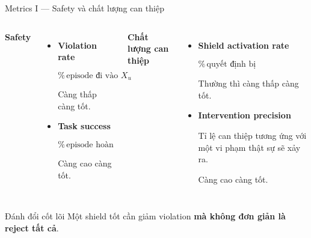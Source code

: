 \documentclass[aspectratio=169]{beamer}
\begin{document}
\begin{frame}[t,shrink=8]{Metrics I --- Safety và chất lượng can thiệp}

\begin{columns}[T]


\textbf{Safety}

\begin{itemize}
    \item \textbf{Violation rate}

    \[
    \%\,\text{episode đi vào }X_u
    \]

    Càng thấp càng tốt.

    \item \textbf{Task success}

    \[
    \%\,\text{episode hoàn thành nhiệm vụ}
    \]

    Càng cao càng tốt.
\end{itemize}


\textbf{Chất lượng can thiệp}

\begin{itemize}
    \item \textbf{Shield activation rate}

    \[
    \%\,\text{quyết định bị reject/repair/fallback}
    \]

    Thường thì càng thấp càng tốt.

    \item \textbf{Intervention precision}

    Tỉ lệ can thiệp tương ứng với một vi phạm thật sự
    sẽ xảy ra.

    Càng cao càng tốt.
\end{itemize}

\end{columns}

\vspace{7pt}

\begin{alertblock}{Đánh đổi cốt lõi}
Một shield tốt cần giảm violation \textbf{mà không đơn giản là reject
tất cả}.
\end{alertblock}

\end{frame}
\end{document}
